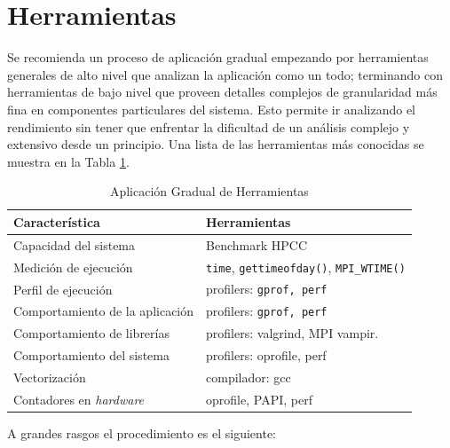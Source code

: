 \documentclass[a4paper]{report}
\begin{document}
\section{Herramientas}

Se recomienda un proceso de aplicación gradual empezando por herramientas generales de alto nivel que analizan la aplicación como un todo; terminando con herramientas de bajo nivel que proveen detalles complejos de granularidad más fina en componentes particulares del sistema. Esto permite ir analizando el rendimiento sin tener que enfrentar la dificultad de un análisis complejo y extensivo desde un principio. Una lista de las herramientas más conocidas se muestra en la Tabla \ref{table:tooling}.

\begin{table}[H]
\caption{Aplicación Gradual de Herramientas}
\begin{tabular}{|l|l|} \hline
{\bf Característica} & {\bf Herramientas} \\ \hline
Capacidad del sistema & Benchmark HPCC \\ \hline
Medición de ejecución & {\tt time}, {\tt gettimeofday()}, {\tt MPI\_WTIME()} \\ \hline
Perfil de ejecución & profilers: {\tt gprof, perf} \\ \hline
Comportamiento de la aplicación & profilers: {\tt gprof, perf} \\ \hline
Comportamiento de librerías & profilers: valgrind, MPI vampir. \\ \hline
Comportamiento del sistema & profilers: oprofile, perf \\ \hline
Vectorización & compilador: gcc \\ \hline
Contadores en {\it hardware} & oprofile, PAPI, perf \\ \hline
\end{tabular}
\label{table:tooling}
\end{table}

A grandes rasgos el procedimiento es el siguiente:
\end{document}
